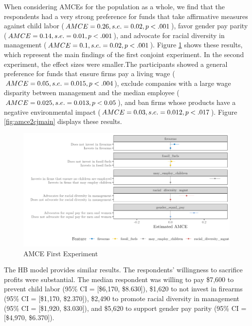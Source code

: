 \documentclass[
  12pt,
]{article}
\begin{document}
When considering AMCEs for the population as a whole, we find that the respondents had a very strong preference for funds that take affirmative measures against child labor (\(AMCE = 0.26, \space s.e. = 0.02, \space p < .001\)), favor gender pay parity (\(AMCE = 0.14, \space s.e. = 0.01, \space p < .001\)), and advocate for racial diversity in management (\(AMCE = 0.1, \space s.e. =0.02, \space p < .001\)). Figure \ref{fig:amce1cjmain} shows these results, which represent the main findings of the first conjoint experiment. In the second experiment, the effect sizes were smaller.The participants showed a general preference for funds that ensure firms pay a living wage (\(AMCE = 0.05, \space s.e. = 0.015, \space p < .004\)), exclude companies with a large wage disparity between management and the median employee (\(AMCE = 0.025, \space s.e. = 0.013, \space p <0.05\)), and ban firms whose products have a negative environmental impact (\(AMCE = 0.03, \space s.e. = 0.012, \space p < .017\)). Figure \ref{fig:amce2cjmain} displays these results.

\begin{figure}

{\centering \includegraphics{amcecj1jmainb} 

}

\caption{AMCE First Experiment}\label{fig:amce1cjmain}
\end{figure}

The HB model provides similar results. The respondents' willingness to sacrifice profits were substantial. The median respondent was willing to pay \$7,600 to prevent child labor (95\% CI = {[}\$6,170, \$8.630{]}), \$1,620 to not invest in firearms (95\% CI = {[}\$1,170, \$2.370{]}), \$2,490 to promote racial diversity in management (95\% CI = {[}\$1,920, \$3.030{]}), and \$5,620 to support gender pay parity (95\% CI = {[}\$4,970, \$6.370{]}).
\end{document}
